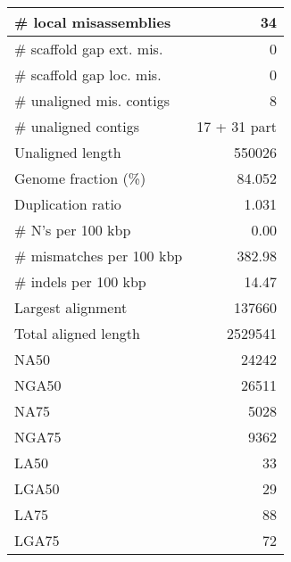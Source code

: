 \documentclass[12pt,a4paper]{article}
\begin{document}
\begin{table}[ht]
\begin{center}
\begin{tabular}{|l*{1}{|r}|}
\# local misassemblies & 34 \\ \hline
\# scaffold gap ext. mis. & 0 \\ \hline
\# scaffold gap loc. mis. & 0 \\ \hline
\# unaligned mis. contigs & 8 \\ \hline
\# unaligned contigs & 17 + 31 part \\ \hline
Unaligned length & 550026 \\ \hline
Genome fraction (\%) & 84.052 \\ \hline
Duplication ratio & 1.031 \\ \hline
\# N's per 100 kbp & 0.00 \\ \hline
\# mismatches per 100 kbp & 382.98 \\ \hline
\# indels per 100 kbp & 14.47 \\ \hline
Largest alignment & 137660 \\ \hline
Total aligned length & 2529541 \\ \hline
NA50 & 24242 \\ \hline
NGA50 & 26511 \\ \hline
NA75 & 5028 \\ \hline
NGA75 & 9362 \\ \hline
LA50 & 33 \\ \hline
LGA50 & 29 \\ \hline
LA75 & 88 \\ \hline
LGA75 & 72 \\ \hline
\end{tabular}
\end{center}
\end{table}
\end{document}
